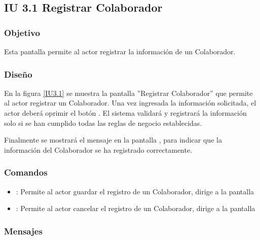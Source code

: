 \subsection{IU 3.1 Registrar Colaborador}

\subsubsection{Objetivo}
	Esta pantalla permite al actor registrar la información de un Colaborador.
\subsubsection{Diseño}
	En la figura \ref{IU3.1} se muestra la pantalla ''Registrar Colaborador'' que permite al actor registrar un Colaborador.
	Una vez ingresada la información solicitada, el actor deberá oprimir el botón  . El sistema validará y registrará la información solo si se han cumplido todas las reglas de negocio establecidas.
	
	Finalmente se mostrará el mensaje  en la pantalla , para indicar que la información del Colaborador se ha registrado correctamente.

\label{IU3.1}
\subsubsection{Comandos}
\begin{itemize}
	\item {}: Permite al actor guardar el registro de un Colaborador, dirige a la pantalla 
	\item {}: Permite al actor cancelar el registro de un Colaborador, dirige a la pantalla 
\end{itemize}

\subsubsection{Mensajes}


